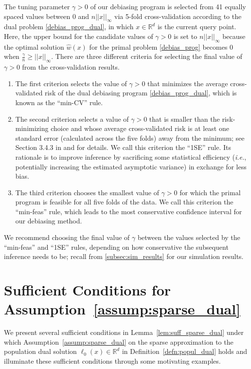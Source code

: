 \documentclass[ejsv2,noshowframe]{imsart}
\theoremstyle{plain}
\theoremstyle{definition}
\theoremstyle{remark}
\newcommand{\norm}[1]{\left|\left| #1 \right|\right|}
\renewcommand{\hat}{\widehat}
\begin{document}
The tuning parameter $\gamma >0$ of our debiasing program is selected from 41 equally spaced values between 0 and $n\norm{x}_{\infty}$ via 5-fold cross-validation according to the dual problem \eqref{debias_prog_dual}, in which $x\in \mathbb{R}^d$ is the current query point. Here, the upper bound for the candidate values of $\gamma>0$ is set to $n\norm{x}_{\infty}$ because the optimal solution $\hat{w}(x)$ for the primal problem \eqref{debias_prog} becomes 0 when $\frac{\gamma}{n} \geq \norm{x}_{\infty}$. There are three different criteria for selecting the final value of $\gamma>0$ from the cross-validation results. 
\begin{enumerate}[label=(\roman*)]
	\item The first criterion selects the value of $\gamma>0$ that minimizes the average cross-validated risk of the dual debiasing program \eqref{debias_prog_dual}, which is known as the ``min-CV'' rule.
	
	\item The second criterion selects a value of $\gamma>0$ that is smaller than the risk-minimizing choice and whose average cross-validated risk is at least one standard error (calculated across the five folds) away from the minimum; see Section 3.4.3 in \cite{BreiFrieStonOlsh84} and \cite{chen2021one} for details. We call this criterion the ``1SE'' rule. Its rationale is to improve inference by sacrificing some statistical efficiency (\emph{i.e.}, potentially increasing the estimated asymptotic variance) in exchange for less bias. 
	
	\item The third criterion chooses the smallest value of $\gamma>0$ for which the primal program is feasible for all five folds of the data. We call this criterion the ``min-feas'' rule, which leads to the most conservative confidence interval for our debiasing method.
\end{enumerate}
We recommend choosing the final value of $\gamma$ between the values selected by the ``min-feas'' and ``1SE'' rules, depending on how conservative the subsequent inference needs to be; recall from \autoref{subsec:sim_results} for our simulation results.


\section{Sufficient Conditions for Assumption~\ref{assump:sparse_dual}}
\label{app:suff_cond_dual}

We present several sufficient conditions in Lemma~\ref{lem:suff_sparse_dual} under which Assumption~\ref{assump:sparse_dual} on the sparse approximation to the population dual solution $\ell_0(x) \in \mathbb{R}^d$ in Definition~\ref{defn:popul_dual} holds and illuminate these sufficient conditions through some motivating examples.
\end{document}
